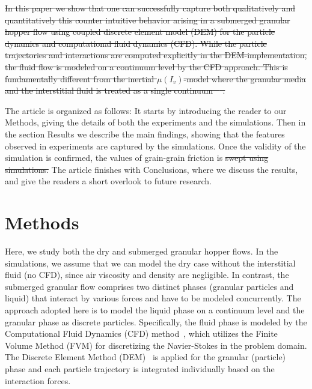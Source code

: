\documentclass[twoside,twocolumn,9pt]{article}
\providecommand{\DIFadd}[1]{{\protect\color{blue}\uwave{#1}}} %
\providecommand{\DIFdel}[1]{{\protect\color{red}\sout{#1}}}                      %
\providecommand{\DIFaddbegin}{} %
\providecommand{\DIFaddend}{} %
\providecommand{\DIFdelbegin}{} %
\providecommand{\DIFdelend}{} %
\newcommand{\DIFscaledelfig}{0.5}
\newlength{\DIFdelgraphicswidth} %
\newlength{\DIFdelgraphicsheight} %
\newcommand{\DIFaddincludegraphics}[2][]{{\color{blue}\fbox{\DIFOincludegraphics[#1]{#2}}}} %
\newcommand{\DIFdelincludegraphics}[2][]{%
\sbox{\DIFdelgraphicsbox}{\DIFOincludegraphics[#1]{#2}}%
\settoboxwidth{\DIFdelgraphicswidth}{\DIFdelgraphicsbox} %
\settoboxtotalheight{\DIFdelgraphicsheight}{\DIFdelgraphicsbox} %
\scalebox{\DIFscaledelfig}{%
\parbox[b]{\DIFdelgraphicswidth}{\usebox{\DIFdelgraphicsbox}\\[-\baselineskip] \rule{\DIFdelgraphicswidth}{0em}}\llap{\resizebox{\DIFdelgraphicswidth}{\DIFdelgraphicsheight}{%
\setlength{\unitlength}{\DIFdelgraphicswidth}%
\begin{picture}(1,1)%
\thicklines\linethickness{2pt} %
{\color[rgb]{1,0,0}\put(0,0){\framebox(1,1){}}}%
{\color[rgb]{1,0,0}\put(0,0){\line( 1,1){1}}}%
{\color[rgb]{1,0,0}\put(0,1){\line(1,-1){1}}}%
\end{picture}%
}\hspace*{3pt}}} %
} %
\DeclareRobustCommand{\DIFaddbegin}{\DIFOaddbegin \let\includegraphics\DIFaddincludegraphics} %
\DeclareRobustCommand{\DIFaddend}{\DIFOaddend \let\includegraphics\DIFOincludegraphics} %
\DeclareRobustCommand{\DIFdelbegin}{\DIFOdelbegin \let\includegraphics\DIFdelincludegraphics} %
\DeclareRobustCommand{\DIFdelend}{\DIFOaddend \let\includegraphics\DIFOincludegraphics} %
\begin{document}
\DIFdelbegin \DIFdel{In this paper we show that one can successfully capture both qualitatively and quantitatively this counter intuitive behavior arising in a submerged granular hopper flow using coupled discrete element model (DEM) for the particle dynamics and computational fluid dynamics (CFD). While the particle trajectories and interactions are computed explicitly in the DEM-implementation, the fluid flow is modeled on a continuum level by the CFD approach. This is fundamentally different from the inertial $\mu(I_v)$-model where the granular media and the interstitial fluid is treated as a single continuum \mbox{%
\cite{Boyer11PRL}}\hspace{0pt}%
.
}%

\DIFdelend The article is organized as follows: It starts by introducing the reader to our Methods, giving the details of both the experiments and the simulations. Then in the section Results we describe the main findings, showing that the features observed in experiments are captured by the simulations. Once the validity of the simulation is confirmed, the values of grain-grain friction is \DIFdelbegin \DIFdel{swept using simulations.
}\DIFdelend \DIFaddbegin \DIFadd{varied in the simulations.
}\DIFaddend The article finishes with Conclusions, where we discuss the results, and give the readers a short overlook to future research.

\section{Methods}

Here, we study both the dry and submerged granular hopper flows.
In the simulations, we assume that we can model the dry case without 
the interstitial fluid (no CFD), since  air viscosity and density are 
negligible.
In contrast, the submerged granular flow comprises two distinct 
phases (granular particles and liquid) that interact by various forces 
and have to be modeled concurrently. 
The approach adopted here is to model the liquid phase on a continuum 
level and the granular phase as discrete particles. Specifically, the 
fluid phase is modeled by the Computational Fluid Dynamics (CFD) 
method~\cite{ferziger2012computational}, which utilizes the Finite Volume 
Method (FVM) for discretizing the Navier-Stokes in the problem domain. 
The Discrete Element Method (DEM)~\cite{cundall1979discrete} is applied 
for the granular (particle) phase and each particle trajectory is 
integrated individually based on the interaction forces.
\end{document}
